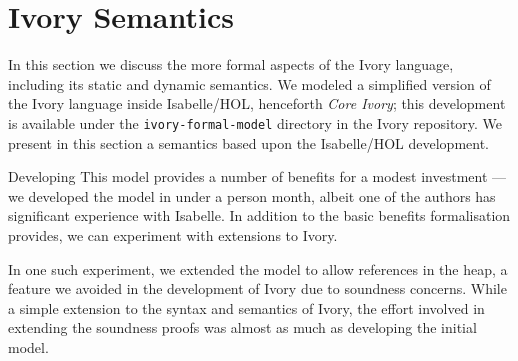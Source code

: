 \newcommand{\coreivory}{Core Ivory}

\section{Ivory Semantics}
\label{sec:semantics}

In this section we discuss the more formal aspects of the Ivory
language, including its static and dynamic semantics.  We modeled a
simplified version of the Ivory language inside
Isabelle/HOL, henceforth \emph{\coreivory{}}; this
development is available under the \texttt{ivory-formal-model}
directory in the Ivory repository.  We present in this section a
semantics based upon the Isabelle/HOL development.

Developing This model provides a number of benefits for a modest
investment --- we developed the model in under a person month, albeit
one of the authors has significant experience with Isabelle.  In
addition to the basic benefits formalisation provides, we can
experiment with extensions to Ivory.

In one such experiment, we extended the model to allow references in
the heap, a feature we avoided in the development of Ivory due to
soundness concerns.  While a simple extension to the syntax and
semantics of Ivory, the effort involved in extending the soundness
proofs was almost as much as developing the initial model.  

\newcommand{\sep}{\ |\ }

